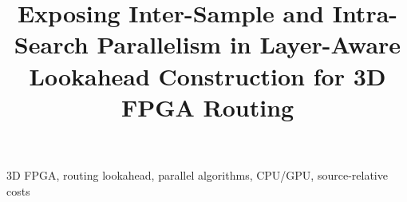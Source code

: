 \documentclass[conference,10pt,letterpaper]{IEEEtran}
\title{Exposing Inter-Sample and Intra-Search Parallelism in Layer-Aware Lookahead Construction for 3D FPGA Routing}
\author{\IEEEauthorblockN{Anonymous Authors}}
\begin{document}
\maketitle
\begin{abstract}\end{abstract}
\begin{IEEEkeywords}3D FPGA, routing lookahead, parallel algorithms, CPU/GPU, source-relative costs\end{IEEEkeywords}







\clearpage


\end{document}

